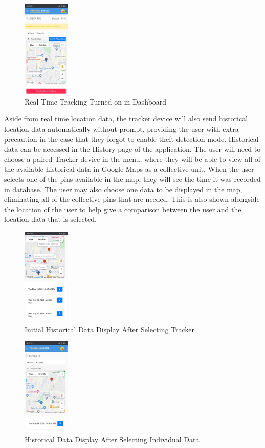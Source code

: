 \documentclass[conference]{IEEEtran}
\begin{document}
\begin{figure}[htbp]
    \centering
    \includegraphics[width=0.2\textwidth]{realtimeon}
    \caption{Real Time Tracking Turned on in Dashboard}
    \label{fig1}
\end{figure}
Aside from real time location data, the tracker device will also send historical location data automatically without prompt, providing the user with extra precaution in the case that they forgot to enable theft detection mode. Historical data can be accessed in the History page of the application. The user will need to choose a paired Tracker device in the menu, 
where they will be able to view all of the available historical data in Google Maps as a collective unit. When the user selects one of the pins available in the map, they will see the time it was recorded in database. The user may also choose one data to be displayed in the map, eliminating all of the collective pins that are needed. This is also shown alongside the location of the user 
to help give a comparison between the user and the location data that is selected.
\begin{figure}[htbp]
    \centering
    \includegraphics[width=0.2\textwidth]{history1}
    \caption{Initial Historical Data Display After Selecting Tracker}
    \label{fig1}
\end{figure}
\begin{figure}[htbp]
    \centering
    \includegraphics[width=0.2\textwidth]{history2}
    \caption{Historical Data Display After Selecting Individual Data}
    \label{fig1}
\end{figure}
\end{document}
